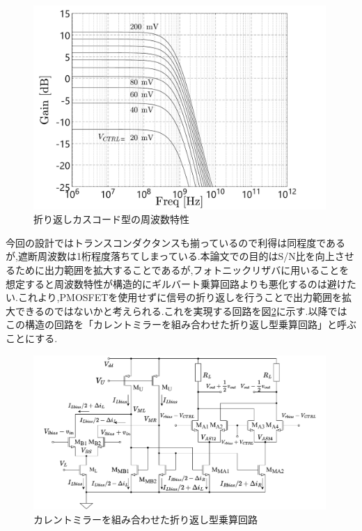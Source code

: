         \begin{figure}[!b]
            \centering
            \includegraphics[width=0.99\textwidth]{figures/chapter3/folded_ac.pdf}
            \caption{折り返しカスコード型の周波数特性}
            \label{fig:3_folded_gilbert_ac}
        \end{figure}
        \clearpage
        今回の設計ではトランスコンダクタンスも揃っているので利得は同程度であるが,遮断周波数は1桁程度落ちてしまっている.本論文での目的はS/N比を向上させるために出力範囲を拡大することであるが,フォトニックリザバに用いることを想定すると周波数特性が構造的にギルバート乗算回路よりも悪化するのは避けたい.これより,PMOSFETを使用せずに信号の折り返しを行うことで出力範囲を拡大できるのではないかと考えられる.これを実現する回路を図\ref{fig:3_folded_mirror_gilbert}に示す.以降ではこの構造の回路を「カレントミラーを組み合わせた折り返し型乗算回路」と呼ぶことにする.\par
        \begin{figure}[!b]
            \begin{center}
                \includegraphics[width=0.99\textwidth]{figures/chapter3/NtoNFolded.pdf}
                \caption{カレントミラーを組み合わせた折り返し型乗算回路}
                \label{fig:3_folded_mirror_gilbert}
            \end{center}
        \end{figure}
